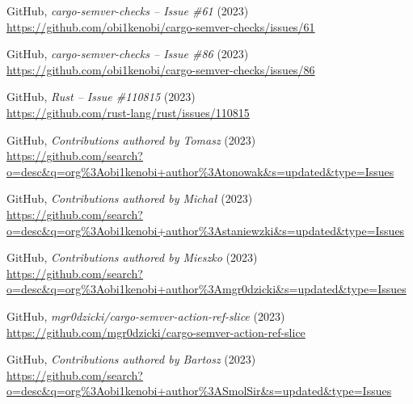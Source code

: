 \documentclass[licencjacka,en]{pracamgr}
\begin{document}
\begin{thebibliography}{99}

 GitHub,
	\textit{cargo-semver-checks -- Issue \#61} (2023) \\
	\url{https://github.com/obi1kenobi/cargo-semver-checks/issues/61}

 GitHub,
	\textit{cargo-semver-checks -- Issue \#86} (2023) \\
	\url{https://github.com/obi1kenobi/cargo-semver-checks/issues/86}









 GitHub,
	\textit{Rust -- Issue \#110815} (2023) \\
	\url{https://github.com/rust-lang/rust/issues/110815}



 GitHub,
	\textit{Contributions authored by Tomasz} (2023) \\
	\url{https://github.com/search?o=desc&q=org%3Aobi1kenobi+author%3Atonowak&s=updated&type=Issues}

 GitHub,
	\textit{Contributions authored by Michał} (2023) \\
	\url{https://github.com/search?o=desc&q=org%3Aobi1kenobi+author%3Astaniewzki&s=updated&type=Issues}

 GitHub,
	\textit{Contributions authored by Mieszko} (2023) \\
	\url{https://github.com/search?o=desc&q=org%3Aobi1kenobi+author%3Amgr0dzicki&s=updated&type=Issues}

 GitHub,
	\textit{mgr0dzicki/cargo-semver-action-ref-slice} (2023) \\
	\url{https://github.com/mgr0dzicki/cargo-semver-action-ref-slice}

 GitHub,
	\textit{Contributions authored by Bartosz} (2023) \\
	\url{https://github.com/search?o=desc&q=org%3Aobi1kenobi+author%3ASmolSir&s=updated&type=Issues}

\end{thebibliography}
\end{document}

